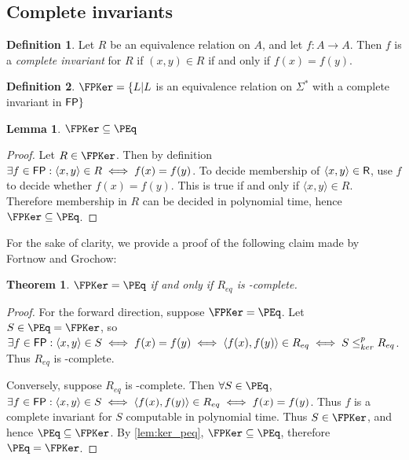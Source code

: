 \documentclass{article}
\newtheorem{theorem}{Theorem}[section]
\newtheorem{lemma}[lemma]{Lemma}
\theoremstyle{definition} \newtheorem{definition}[definition]{Definition}
\newcommand{\sigmastar}{\Sigma^{*}} %
\newcommand{\kr}{\leq^{p}_{ker}} %
\newcommand{\defn}[1]{\emph{#1}} %
\newcommand{\pair}[2]{\langle#1,#2\rangle} %
\begin{document}

\subsection{Complete invariants}
\begin{definition}
  Let $R$ be an equivalence relation on $A$, and let $f\colon A\to A$. Then $f$
  is a \defn{complete invariant} for $R$ if $(x,y)\in R$ if and only if
  $f(x)=f(y)$.
\end{definition}
\begin{definition}
  $\FPKer=\{L|L$ is an equivalence relation on $\sigmastar$ with a complete
  invariant in ${\mathsf{FP}}\}$
\end{definition}

\begin{lemma}\label{lem:ker_peq}
  $\FPKer\subseteq\PEq$
\end{lemma}
\begin{proof}
  Let $R\in\FPKer$. Then by definition $\exists f\in\FP: \pair{x}{y}\in R\iff
  f(x)=f(y)$. To decide membership of $\pair{x}{y}\in\R$, use $f$ to decide
  whether $f(x)=f(y)$. This is true if and only if $\pair{x}{y}\in
  R$. Therefore membership in $R$ can be decided in polynomial time, hence
  $\FPKer\subseteq\PEq$.
\end{proof}

For the sake of clarity, we provide a proof of the following claim made by
Fortnow and Grochow:

\begin{theorem}
  $\FPKer=\PEq$ if and only if $R_{eq}$ is \PEq-complete.
\end{theorem}
\begin{proof}
  For the forward direction, suppose $\FPKer=\PEq$. Let $S\in\PEq=\FPKer$, so
  $\exists f\in\FP: \pair{x}{y}\in S\iff f(x)=f(y)\iff \pair{f(x)}{f(y)}\in
  R_{eq}\iff S\kr R_{eq}$. Thus $R_{eq}$ is \PEq-complete.

  Conversely, suppose $R_{eq}$ is \PEq-complete. Then $\forall S\in\PEq$,
  $\exists f\in\FP:\pair{x}{y}\in S\iff\pair{f(x)}{f(y)}\in R_{eq}\iff
  f(x)=f(y)$. Thus $f$ is a complete invariant for $S$ computable in polynomial
  time. Thus $S\in\FPKer$, and hence $\PEq\subseteq\FPKer$. By
  \autoref{lem:ker_peq}, $\FPKer\subseteq\PEq$, therefore $\PEq=\FPKer$.
\end{proof}
\end{document}
